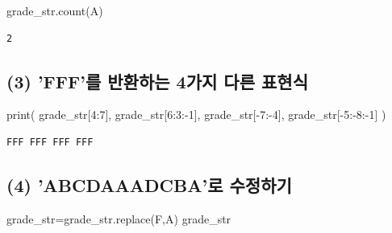 \documentclass[
  letterpaper,
  DIV=11,
  numbers=noendperiod]{scrreprt}
\newenvironment{Shaded}{\begin{snugshade}}{\end{snugshade}}
\newcommand{\BuiltInTok}[1]{\textcolor[rgb]{0.00,0.23,0.31}{#1}}
\newcommand{\DecValTok}[1]{\textcolor[rgb]{0.68,0.00,0.00}{#1}}
\newcommand{\NormalTok}[1]{\textcolor[rgb]{0.00,0.23,0.31}{#1}}
\newcommand{\OperatorTok}[1]{\textcolor[rgb]{0.37,0.37,0.37}{#1}}
\newcommand{\StringTok}[1]{\textcolor[rgb]{0.13,0.47,0.30}{#1}}
\begin{document}
\begin{Shaded}
\begin{Highlighting}[]
\NormalTok{grade\_str.count(}\StringTok{\textquotesingle{}A\textquotesingle{}}\NormalTok{)}
\end{Highlighting}
\end{Shaded}

\begin{verbatim}
2
\end{verbatim}

\subsection*{(3) 'FFF'를 반환하는 4가지 다른
표현식}\label{fffuxb97c-uxbc18uxd658uxd558uxb294-4uxac00uxc9c0-uxb2e4uxb978-uxd45cuxd604uxc2dd}

\begin{Shaded}
\begin{Highlighting}[]
\BuiltInTok{print}\NormalTok{(}
\NormalTok{    grade\_str[}\DecValTok{4}\NormalTok{:}\DecValTok{7}\NormalTok{],}
\NormalTok{    grade\_str[}\DecValTok{6}\NormalTok{:}\DecValTok{3}\NormalTok{:}\OperatorTok{{-}}\DecValTok{1}\NormalTok{],}
\NormalTok{    grade\_str[}\OperatorTok{{-}}\DecValTok{7}\NormalTok{:}\OperatorTok{{-}}\DecValTok{4}\NormalTok{],}
\NormalTok{    grade\_str[}\OperatorTok{{-}}\DecValTok{5}\NormalTok{:}\OperatorTok{{-}}\DecValTok{8}\NormalTok{:}\OperatorTok{{-}}\DecValTok{1}\NormalTok{]}
\NormalTok{)}
\end{Highlighting}
\end{Shaded}

\begin{verbatim}
FFF FFF FFF FFF
\end{verbatim}

\subsection*{(4) 'ABCDAAADCBA'로
수정하기}\label{abcdaaadcbauxb85c-uxc218uxc815uxd558uxae30}

\begin{Shaded}
\begin{Highlighting}[]
\NormalTok{grade\_str}\OperatorTok{=}\NormalTok{grade\_str.replace(}\StringTok{\textquotesingle{}F\textquotesingle{}}\NormalTok{,}\StringTok{\textquotesingle{}A\textquotesingle{}}\NormalTok{)}
\NormalTok{grade\_str}
\end{Highlighting}
\end{Shaded}
\end{document}
